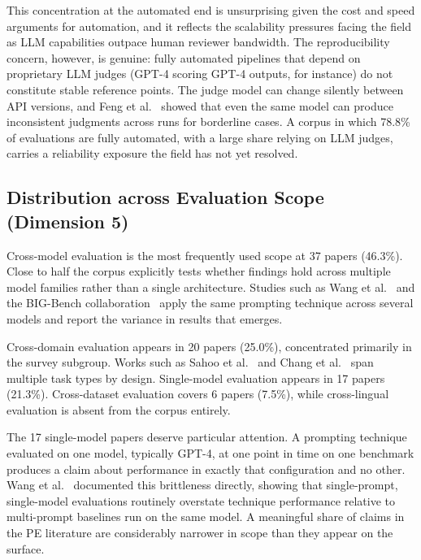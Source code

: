 \documentclass[journal]{IEEEtran}
\begin{document}
This concentration at the automated end is unsurprising given the
cost and speed arguments for automation, and it reflects the scalability
pressures facing the field as LLM capabilities outpace human reviewer
bandwidth. The reproducibility concern, however, is genuine: fully
automated pipelines that depend on proprietary LLM judges (GPT-4
scoring GPT-4 outputs, for instance) do not constitute stable reference
points. The judge model can change silently between API versions, and
Feng et al.~\cite{feng2025sage} showed that even the same model can
produce inconsistent judgments across runs for borderline cases. A
corpus in which 78.8\% of evaluations are fully automated, with a
large share relying on LLM judges, carries a reliability exposure the
field has not yet resolved.

\subsection{Distribution across Evaluation Scope (Dimension 5)}

Cross-model evaluation is the most frequently used scope at 37 papers
(46.3\%). Close to half the corpus explicitly tests whether findings
hold across multiple model families rather than a single architecture.
Studies such as Wang et al.~\cite{wang2023selfconsistency}
and the BIG-Bench collaboration~\cite{srivastava2022bigbench}
apply the same prompting technique across several models
and report the variance in results that emerges.

Cross-domain evaluation appears in 20 papers (25.0\%), concentrated
primarily in the survey subgroup. Works such as
Sahoo et al.~\cite{sahoo2024systematic} and
Chang et al.~\cite{chang2023survey} span multiple task types by
design. Single-model evaluation appears in 17 papers (21.3\%).
Cross-dataset evaluation covers 6 papers (7.5\%), while cross-lingual
evaluation is absent from the corpus entirely.

The 17 single-model papers deserve particular attention. A prompting
technique evaluated on one model, typically GPT-4, at one point in
time on one benchmark produces a claim about performance in exactly
that configuration and no other.
Wang et al.~\cite{wang2023multi} documented this brittleness
directly, showing that single-prompt, single-model evaluations routinely
overstate technique performance relative to multi-prompt baselines
run on the same model. A meaningful share of claims in the PE
literature are considerably narrower in scope than they appear on the surface.
\end{document}

